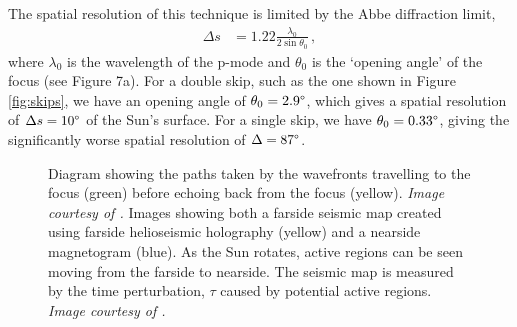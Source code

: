 \documentclass[11pt,a4paper,onecolumn]{report}
\begin{document}
\noindent The spatial resolution of this technique is limited by the Abbe
diffraction limit,
\begin{align}
  \Delta s &= 1.22\frac{\lambda_0}{2 \sin{\theta_0}}\,,
\end{align}
where \(\lambda_0\) is the wavelength of the p-mode and \(\theta_0\) is the
`opening angle' of the focus (see Figure 7a). For a double skip,
such as the one shown in Figure \ref{fig:skips}, we have an opening angle of
\(\theta_0 =2.9\degree\), which gives a spatial resolution of \(\Delta s =
10\degree\) of the Sun's surface. For a single skip, we have \(\theta_0
=0.33\degree\), giving the significantly worse spatial resolution of \(\Delta =
87\degree\). \\

\begin{figure}[t]%
  \centering
  \qquad
  \caption[]{
     Diagram showing the paths taken by the wavefronts
    travelling to the focus (green) before echoing back from the focus (yellow).
    \textit{Image courtesy of \citet{Lindsey2011}.} Images showing both a farside seismic map created using
    farside helioseismic holography (yellow) and a nearside magnetogram (blue).
    As the Sun rotates, active regions can be seen moving from the farside to
    nearside. The seismic map is measured by the time perturbation, \(\tau\) caused by
    potential active regions. \textit{Image courtesy of \citet{Lindsey2017}.}
    }
\end{figure}
\end{document}
